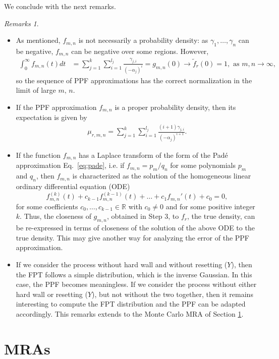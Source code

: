 \documentclass[preprint,12pt]{elsarticle}
\numberwithin{equation}{section}
\theoremstyle{plain} \newtheorem{theorem}{Theorem}[section]
\theoremstyle{plain} \newtheorem{proposition}[theorem]{Proposition}
\theoremstyle{plain} \newtheorem{lemma}[theorem]{Lemma}
\theoremstyle{plain} \newtheorem{corollary}[theorem]{Corollary}
\theoremstyle{definition} \newtheorem{definition}[theorem]{Definition}
\theoremstyle{definition} \newtheorem{notation}[theorem]{Notation}
\theoremstyle{remark} \newtheorem{remark}[theorem]{Remark}
\theoremstyle{remark} \newtheorem{remarks}[theorem]{Remarks}
\theoremstyle{remark} \newtheorem{algorithm2}[theorem]{Algorithm}
\theoremstyle{remark} \newtheorem{example}[theorem]{Example}
\begin{document}
We conclude with the next remarks.
\begin{remarks}
\begin{itemize}
\item[1.]
As mentioned, $f_{m,n}$ is not necessarily a probability density: as $\gamma_1,\ldots,\gamma_n$ can be negative, $f_{m,n}$ can be negative over some regions.
However,
\begin{align*}
    \int_0^{\infty} f_{m,n}(t) dt &= \sum_{j=1}^k \sum_{i=1}^{l_j} \frac{\gamma_{j,i}}{(-\alpha_j)^i} 
    = g_{m,n} (0) \longrightarrow \tilde{f}_r(0) = 1 , 
    \text{ as } m,n \rightarrow \infty,
\end{align*}
so the sequence of PPF approximations has the
correct normalization in the limit of large $m,\,n$. 
\item[2.]
If the PPF approximation $f_{m,n}$ is a proper probability density, then its expectation is given by
\begin{align*}
\mu_{r,m,n}=
    \sum_{j=1}^k \sum_{i=1}^{l_j} \frac{(i+1) \gamma_{j,i}}{(-\alpha_j)^{i+1}}.
\end{align*}
\item[3.] If the function $f_{m,n}$
has a Laplace transform of the form of the Pad\'e
approximation Eq.~\eqref{eq:pade},
i.e. if $f_{m,n}=p_m/q_n$ for some polynomials
$p_m$ and $q_n$, then $f_{m,n}$ 
is characterized as the solution of the homogeneous linear
ordinary differential equation (ODE)
$$
f_{m,n}^{(k)}(t) + c_{k-1} f_{m,n}^{(k-1)}(t) + \ldots +
c_{1} f_{m,n}'(t)
+ c_0 = 0,$$
for some coefficients 
$c_0,\ldots,c_{k-1} \in \mathbb{R}$ 
with $c_0 \neq 0$ and
for some positive integer $k$.
Thus, the closeness of $g_{m,n}$,
obtained in Step 3,
to $f_r$, the true density, can
be re-expressed in terms of closeness of the 
solution of the above 
ODE to the true density.
This may give another way for analyzing the 
error of the PPF approximation.
\item 
If we consider the process without hard wall and without resetting ($Y$), then the FPT follows a simple distribution, which is the inverse Gaussian. In this case, the PPF becomes meaningless.
If we consider the process without 
either hard wall or resetting ($Y$), but not without the two together, then it remains interesting to compute the FPT distribution
and the PPF can be adapted accordingly.
This remarks extends to the Monte Carlo MRA of
Section \ref{sec:multires}.
\end{itemize}
\end{remarks}

\section{MRAs}
\label{sec:multires}
\end{document}
